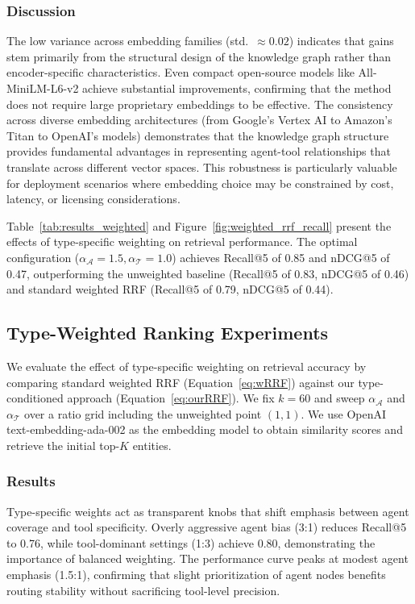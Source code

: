 \documentclass[a4paper,twoside]{article}
\begin{document}
\subsubsection{Discussion}

The low variance across embedding families (std.\ \(\approx 0.02\)) indicates that gains stem primarily from the structural design of the knowledge graph rather than encoder-specific characteristics. Even compact open-source models like All-MiniLM-L6-v2 achieve substantial improvements, confirming that the method does not require large proprietary embeddings to be effective. The consistency across diverse embedding architectures (from Google's Vertex AI to Amazon's Titan to OpenAI's models) demonstrates that the knowledge graph structure provides fundamental advantages in representing agent-tool relationships that translate across different vector spaces. This robustness is particularly valuable for deployment scenarios where embedding choice may be constrained by cost, latency, or licensing considerations.

Table~\ref{tab:results_weighted} and Figure~\ref{fig:weighted_rrf_recall} present the effects of type-specific weighting on retrieval performance. The optimal configuration (\(\alpha_{\mathcal{A}}=1.5, \alpha_{\mathcal{T}}=1.0\)) achieves Recall@5 of 0.85 and nDCG@5 of 0.47, outperforming the unweighted baseline (Recall@5 of 0.83, nDCG@5 of 0.46) and standard weighted RRF (Recall@5 of 0.79, nDCG@5 of 0.44). 

\subsection{Type-Weighted Ranking Experiments}

We evaluate the effect of type-specific weighting on retrieval accuracy by comparing standard weighted RRF (Equation~\ref{eq:wRRF}) against our type-conditioned approach (Equation~\ref{eq:ourRRF}). We fix \(k=60\) and sweep \(\alpha_{\mathcal{A}}\) and \(\alpha_{\mathcal{T}}\) over a ratio grid including the unweighted point \((1,1)\). We use OpenAI text-embedding-ada-002 as the embedding model to obtain similarity scores and retrieve the initial top-\(K\) entities.

\subsubsection{Results}



Type-specific weights act as transparent knobs that shift emphasis between agent coverage and tool specificity. Overly aggressive agent bias (3:1) reduces Recall@5 to 0.76, while tool-dominant settings (1:3) achieve 0.80, demonstrating the importance of balanced weighting. The performance curve peaks at modest agent emphasis (1.5:1), confirming that slight prioritization of agent nodes benefits routing stability without sacrificing tool-level precision.
\end{document}
